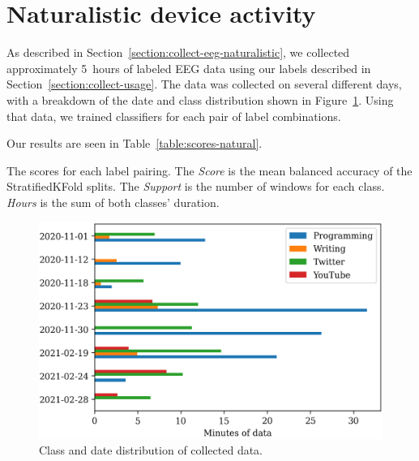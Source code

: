     \section{Naturalistic device activity}

        As described in Section~\ref{section:collect-eeg-naturalistic}, we collected approximately \SI{5}{hours} of labeled EEG data using our labels described in Section~\ref{section:collect-usage}. The data was collected on several different days, with a breakdown of the date and class distribution shown in Figure~\ref{figure:dayclass-dist}. Using that data, we trained classifiers for each pair of label combinations. 

        Our results are seen in Table~\ref{table:scores-natural}.


        \begin{table}[h]
            \centering
            
            \caption{The scores for each label pairing. The \textit{Score} is the mean balanced accuracy of the StratifiedKFold splits. The \textit{Support} is the number of windows for each class. \textit{Hours} is the sum of both classes' duration.}\label{table:scores-natural}
        \end{table}

        \begin{figure}[h]
            \centering
            \includegraphics[width=12cm]{img/naturalistic-dayclass-dist.png}
            \caption{Class and date distribution of collected data.}\label{figure:dayclass-dist}
        \end{figure}

        \vfill
